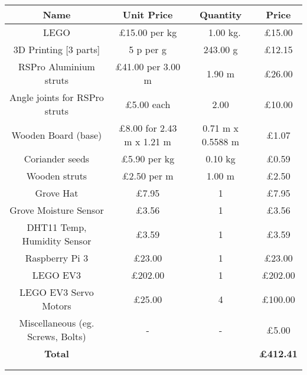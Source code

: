 \begin{tabular}{|c|c|c|c|}
\hline

\textbf{Name}  & \textbf{Unit Price} & \textbf{Quantity} & \textbf{Price} \\
\hline
LEGO    & £15.00 per kg & ~ 1.00 kg. & £15.00 \\
\hline
3D Printing [3 parts]    & 5 p per g & 243.00 g & £12.15\\
\hline
RSPro Aluminium struts    & £41.00 per 3.00 m & 1.90 m & £26.00 \\
\hline
Angle joints for RSPro struts    & £5.00 each & 2.00 & £10.00 \\
\hline
Wooden Board (base)    & £8.00 for 2.43 m x 1.21 m & 0.71 m x 0.5588 m  & £1.07 \\
\hline
Coriander seeds   & £5.90 per kg & 0.10 kg & £0.59 \\
\hline
Wooden struts   & £2.50 per m & 1.00 m & £2.50 \\
\hline
Grove Hat   & £7.95 & 1 & £7.95 
\\ 
\hline
Grove Moisture Sensor & £3.56 & 1 & £3.56 
\\ 
\hline
DHT11 Temp, Humidity Sensor & £3.59 & 1 & £3.59 
\\ 
\hline
Raspberry Pi 3 & £23.00 & 1 & £23.00 
\\ 
\hline
LEGO EV3 & £202.00 & 1 & £202.00 
\\ 
\hline
LEGO EV3 Servo Motors & £25.00 & 4 & £100.00
\\ 
\hline
Miscellaneous (eg. Screws, Bolts) & - & - & £5.00 
\\ 
\hline
\textbf{Total} &  &  &  \textbf{£412.41} \\
\hline
\\
\caption{test Overall estimated budget}
\end{tabular}